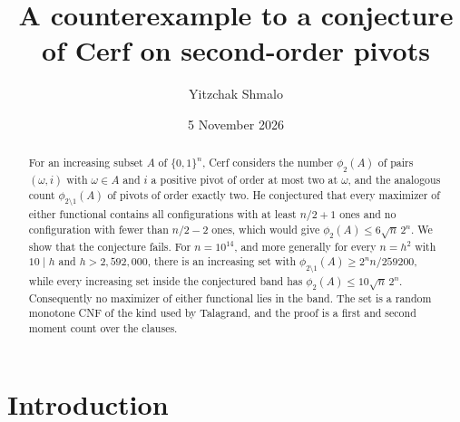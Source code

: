 \documentclass[11pt]{amsart}
\title{A counterexample to a conjecture of Cerf on second-order pivots}
\author{Yitzchak Shmalo}
\date{5 November 2026}
\theoremstyle{definition}
\theoremstyle{remark}
\numberwithin{equation}{section}
\begin{document}
\begin{abstract}
For an increasing subset $A$ of $\{0,1\}^n$, Cerf considers the number $\phi_2(A)$ of pairs $(\omega,i)$ with $\omega\in A$ and $i$ a positive pivot of order at most two at $\omega$, and the analogous count $\phi_{2\setminus1}(A)$ of pivots of order exactly two. He conjectured that every maximizer of either functional contains all configurations with at least $n/2+1$ ones and no configuration with fewer than $n/2-2$ ones, which would give $\phi_2(A)\le 6\sqrt n\,2^n$. We show that the conjecture fails. For $n=10^{14}$, and more generally for every $n=h^2$ with $10\mid h$ and $h>2{,}592{,}000$, there is an increasing set with $\phi_{2\setminus1}(A)\ge 2^n n/259200$, while every increasing set inside the conjectured band has $\phi_2(A)\le 10\sqrt n\,2^n$. Consequently no maximizer of either functional lies in the band. The set is a random monotone CNF of the kind used by Talagrand, and the proof is a first and second moment count over the clauses.
\end{abstract}
\maketitle

\section{Introduction}
\end{document}
